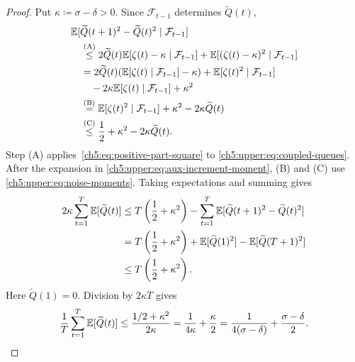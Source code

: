 \begin{proof}
Put $\kappa\coloneqq\sigma-\delta>0$. Since $\mathcal F_{t-1}$
determines $\widetilde Q(t)$,
\begin{align}
&\mathbb{E}[\widetilde Q(t+1)^2-\widetilde Q(t)^2
       \mid\mathcal F_{t-1}]\notag\\
 &\quad\overset{\mathrm{(A)}}{\le}
 2\widetilde Q(t)\mathbb{E}[\zeta(t)-\kappa\mid\mathcal F_{t-1}]
+\mathbb{E}[(\zeta(t)-\kappa)^2\mid\mathcal F_{t-1}]\notag\\
 &\quad=2\widetilde Q(t)(\mathbb{E}[\zeta(t)\mid\mathcal F_{t-1}]-\kappa)
+\mathbb{E}[\zeta(t)^2\mid\mathcal F_{t-1}]\notag\\
 &\qquad-2\kappa\mathbb{E}[\zeta(t)\mid\mathcal F_{t-1}]+\kappa^2
 \label{ch5:upper:eq:aux-increment-moment}\\
 &\quad\overset{\mathrm{(B)}}{=}
 \mathbb{E}[\zeta(t)^2\mid\mathcal F_{t-1}]+\kappa^2-2\kappa\widetilde Q(t)\notag\\
 &\quad\overset{\mathrm{(C)}}{\le}
 \frac12+\kappa^2-2\kappa\widetilde Q(t).
\label{ch5:upper:eq:aux-one-slot-drift}
\end{align}
Step (A) applies~\eqref{ch5:eq:positive-part-square} to
\eqref{ch5:upper:eq:coupled-queues}. After the expansion in
\eqref{ch5:upper:eq:aux-increment-moment}, (B) and (C) use
\eqref{ch5:upper:eq:noise-moments}. Taking expectations and summing gives
\begin{align}
2\kappa\sum_{t=1}^{T}\mathbb{E}[\widetilde Q(t)]
 &\le T\left(\frac12+\kappa^2\right)
 -\sum_{t=1}^T\mathbb{E}[\widetilde Q(t+1)^2-\widetilde Q(t)^2]\notag\\
 &=T\left(\frac12+\kappa^2\right)
 +\mathbb{E}[\widetilde Q(1)^2]-\mathbb{E}[\widetilde Q(T+1)^2]\notag\\
 &\le T\left(\frac12+\kappa^2\right).
 \label{ch5:upper:eq:aux-summed-drift}
\end{align}
Here $\widetilde Q(1)=0$. Division by $2\kappa T$ gives
\begin{equation}
 \frac1T\sum_{t=1}^{T}\mathbb{E}[\widetilde Q(t)]
 \le\frac{1/2+\kappa^2}{2\kappa}
 =\frac{1}{4\kappa}+\frac\kappa2
 =\frac{1}{4(\sigma-\delta)}+\frac{\sigma-\delta}{2}.
 \label{ch5:upper:eq:aux-drift}
\end{equation}


\end{proof}
